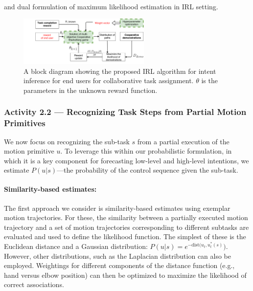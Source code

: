 \documentclass[letterpaper, 11 pt, onecolumn]{article}
\begin{document}
and dual formulation of maximum likelihood estimation in IRL
setting. 
\begin{figure}
  \begin{center}
    \includegraphics[width=0.58\textwidth]{fig/IRL_game}
  \end{center}
  \caption{A block diagram showing the proposed IRL algorithm for intent inference for  end users for collaborative task assignment. $\theta$ is the parameters in the unknown reward function. }
  \end{figure}

\subsubsection{Activity 2.2 --- Recognizing Task Steps from Partial Motion Primitives}\label{sec:plan-intent-prediction}

We now focus on recognizing the sub-task $s$ from a partial execution of the motion primitive $u$. To leverage this within our probabilistic formulation, in which it is a key component for forecasting low-level and high-level intentions, we estimate $P(u|s)$---the probability of the control sequence given the sub-task.

\paragraph{Similarity-based estimates:}

The first approach we consider is similarity-based estimates using exemplar motion trajectories.  For these, the similarity between a partially executed motion trajectory and a set of motion trajectories corresponding to different subtasks are evaluated and used to define the likelihood function.  The simplest of these is the Euclidean distance and a Gaussian distribution: $P(u|s) = e^{-\text{dist}(u_t,u_t^*(s)})$.
However, other distributions, such as the Laplacian distribution can also be employed.  Weightings for different components of the distance function (e.g., hand versus elbow position) can then be optimized to maximize the likelihood of correct associations.
\end{document}
